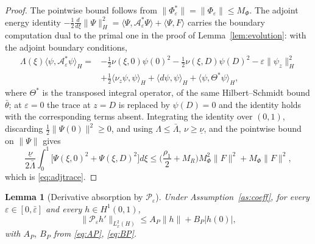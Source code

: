 \documentclass[12pt]{article}
\theoremstyle{plain}
\newtheorem{lemma}{Lemma}
\theoremstyle{remark}
\newcommand{\un}{\underline\nu}
\newcommand{\PP}{\mathcal P}
\newcommand{\Hs}{H}
\begin{document}
\begin{proof}
The pointwise bound follows from $\|\Phi_\varepsilon^*\|=\|\Phi_\varepsilon\|\le M_\Phi$. The adjoint energy identity $-\tfrac12\frac{d}{d\xi}\|\Psi\|_\Hs^2=\langle\Psi,\mathcal A_\varepsilon^*\Psi\rangle+\langle\Psi,F\rangle$ carries the boundary computation dual to the primal one in the proof of Lemma~\ref{lem:evolution}: with the adjoint boundary conditions,
\begin{align}
 \Lambda(\xi)\langle\psi,\mathcal A_\varepsilon^*\psi\rangle_\Hs
 =&-\tfrac12\nu(\xi,0)\psi(0)^2-\tfrac12\nu(\xi,D)\psi(D)^2
 -\varepsilon\|\psi_z\|_\Hs^2
 \nonumber\\
 &+\tfrac12\langle\nu_z\psi,\psi\rangle_\Hs
 +\langle d\psi,\psi\rangle_\Hs+\langle\psi,\Theta^*\psi\rangle_\Hs ,
 \label{eq:adjdiss}
\end{align}
where $\Theta^*$ is the transposed integral operator, of the same Hilbert--Schmidt bound $\bar\theta$; at $\varepsilon=0$ the trace at $z=D$ is replaced by $\psi(D)=0$ and the identity holds with the corresponding terms absent. Integrating the identity over $(0,1)$, discarding $\tfrac12\|\Psi(0)\|^2\ge0$, and using $\Lambda\le\bar\Lambda$, $\nu\ge\un$, and the pointwise bound on $\|\Psi\|$ gives
\begin{equation}
 \frac{\un}{2\bar\Lambda}\int_0^1\big[\Psi(\xi,0)^2+\Psi(\xi,D)^2\big]d\xi
 \le\Big(\frac{\rho_1}{2}+M_R\Big)M_\Phi^2\|F\|^2+M_\Phi\|F\|^2,
 \label{eq:adjtraceproof}
\end{equation}
which is \eqref{eq:adjtrace}.
\end{proof}


\begin{lemma}[Derivative absorption by $\PP_\varepsilon$]\label{lem:Pux}
Under Assumption~\ref{as:coeff}, for every $\varepsilon\in[0,\bar\varepsilon]$ and every $h\in H^1(0,1)$,
\begin{equation}
 \|\PP_\varepsilon h'\|_{L^2_x(\Hs)}
 \le A_P\|h\|+B_P|h(0)|,
 \label{eq:Puxbound}
\end{equation}
with $A_P$, $B_P$ from \eqref{eq:AP}, \eqref{eq:BP}.
\end{lemma}
\end{document}
